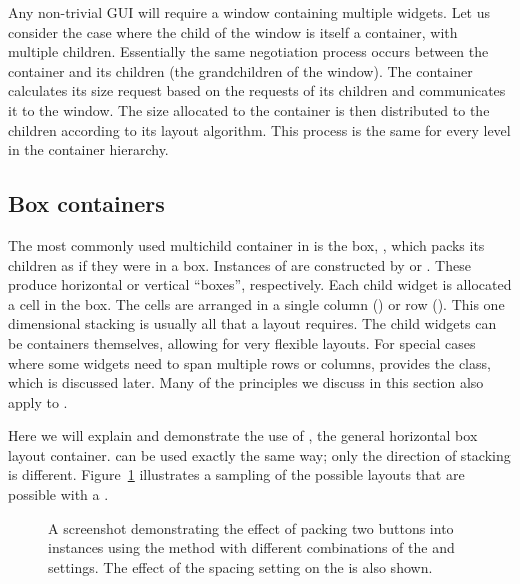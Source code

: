 Any non-trivial GUI will require a window containing multiple
widgets. Let us consider the case where the child of the window is
itself a container, with multiple children.  Essentially the same
negotiation process occurs between the container and its children (the
grandchildren of the window). The container calculates its size
request based on the requests of its children and communicates it to
the window. The size allocated to the container is then distributed to
the children according to its layout algorithm. This process is the
same for every level in the container hierarchy.

\subsection{Box containers}
\label{sec:RGtk2:layout:box}

The most commonly used multichild container in \GTK\/ is the box,
, which packs its children as if they were in a
box. Instances of  are constructed by 
or .  These produce horizontal or vertical
``boxes'', respectively. Each child widget is allocated a cell in the
box.  The cells are arranged in a single column () or
row (). This one dimensional stacking is usually all
that a layout requires. The child widgets can be containers
themselves, allowing for very flexible layouts. For special cases
where some widgets need to span multiple rows or columns, \GTK\/
provides the  class, which is discussed later.  Many
of the principles we discuss in this section also apply to
.

Here we will explain and demonstrate the use of , the
general horizontal box layout container.  can be used
exactly the same way; only the direction of stacking is different.
Figure~\ref{fig:packing} illustrates a sampling of the possible
layouts that are possible with a .

\begin{figure}[h!tbp]
  \begin{center}
    \caption{\label{fig:packing}A screenshot demonstrating the effect
      of packing two buttons into  instances using the
       method with different combinations of
      the  and
       settings.  The effect of the
       spacing setting on the
       is also shown.}
  \end{center}
\end{figure}

